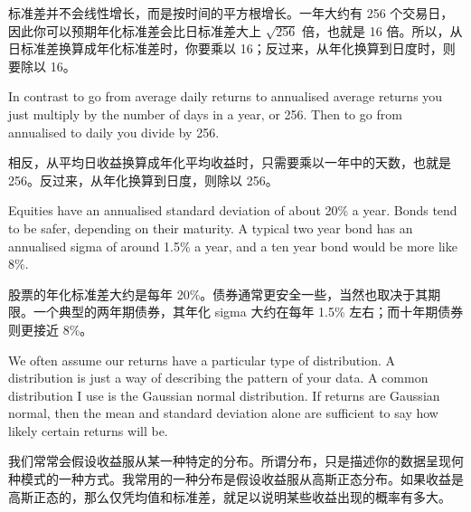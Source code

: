 \begin{chineseblock}标准差并不会线性增长，而是按时间的平方根增长。一年大约有 256 个交易日，因此你可以预期年化标准差会比日标准差大上 $\sqrt{256}$ 倍，也就是 16 倍。所以，从日标准差换算成年化标准差时，你要乘以 16；反过来，从年化换算到日度时，则要除以 16。 \end{chineseblock}

\bipairgap

\begin{englishblock} In contrast to go from average daily returns to annualised average returns you just multiply by the number of days in a year, or 256. Then to go from annualised to daily you divide by 256. \end{englishblock}

\begin{chineseblock}相反，从平均日收益换算成年化平均收益时，只需要乘以一年中的天数，也就是 256。反过来，从年化换算到日度，则除以 256。 \end{chineseblock}

\bipairgap

\begin{englishblock} Equities have an annualised standard deviation of about 20\% a year. Bonds tend to be safer, depending on their maturity. A typical two year bond has an annualised sigma of around 1.5\% a year, and a ten year bond would be more like 8\%. \end{englishblock}

\begin{chineseblock}股票的年化标准差大约是每年 20\%。债券通常更安全一些，当然也取决于其期限。一个典型的两年期债券，其年化 sigma 大约在每年 1.5\% 左右；而十年期债券则更接近 8\%。 \end{chineseblock}

\bipairgap

\begin{englishblock} We often assume our returns have a particular type of distribution. A distribution is just a way of describing the pattern of your data. A common distribution I use is the Gaussian normal distribution. If returns are Gaussian normal, then the mean and standard deviation alone are sufficient to say how likely certain returns will be. \end{englishblock}

\begin{chineseblock}我们常常会假设收益服从某一种特定的分布。所谓分布，只是描述你的数据呈现何种模式的一种方式。我常用的一种分布是假设收益服从高斯正态分布。如果收益是高斯正态的，那么仅凭均值和标准差，就足以说明某些收益出现的概率有多大。\end{chineseblock}


